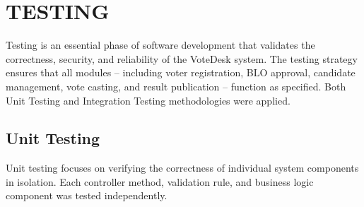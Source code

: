 \chapter{TESTING}

Testing is an essential phase of software development that validates the correctness, security, and reliability of the VoteDesk system. The testing strategy ensures that all modules -- including voter registration, BLO approval, candidate management, vote casting, and result publication -- function as specified. Both Unit Testing and Integration Testing methodologies were applied.

\section{Unit Testing}

Unit testing focuses on verifying the correctness of individual system components in isolation. Each controller method, validation rule, and business logic component was tested independently.

\renewcommand{\arraystretch}{1.3}

